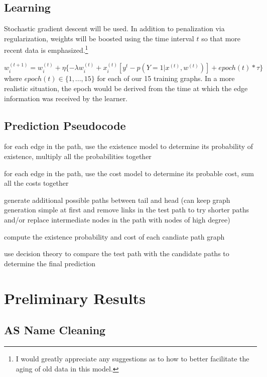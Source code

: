 \documentclass{article} %
\begin{document}
\subsection{Learning}

Stochastic gradient descent will be used.  In addition to penalization via
regularization, weights will be boosted using the time interval $t$ so that more
recent data is emphasized.\footnote{I would greatly appreciate any
  suggestions as to how to better facilitate the aging of old data in this model.}

\begin{displaymath}
w_i^{(t+1)} = w_i^{(t)} + \eta \{- \lambda w_i^{(t)} + x_i^{(t)} [ y^t -  p(Y=1|x^{(t)},w^{(t)})] + epoch(t)*\tau \}
\end{displaymath}
where $epoch(t) \in \{ 1,...,15 \}$ for each of our 15 training graphs.  In a more realistic situation, the epoch would be derived from the time at
which the edge information was received by the learner.

\subsection{Prediction Pseudocode}

\textsf{\small for each edge in the path, use the existence model to determine its probability of existence, multiply all the probabilities together}

\textsf{\small for each edge in the path, use the cost model to determine its probable cost, sum all the costs together}

\textsf{\small generate additional possible paths between tail and head (can keep graph generation simple at first and remove links in the test path to try shorter paths and/or replace intermediate nodes in the path with nodes of high degree)}

\textsf{\small compute the existence probability and cost of each candiate path graph}

\textsf{\small use decision theory to compare the test path with the candidate paths to determine the final prediction}

\section{Preliminary Results}

\subsection{AS Name Cleaning}
\end{document}

